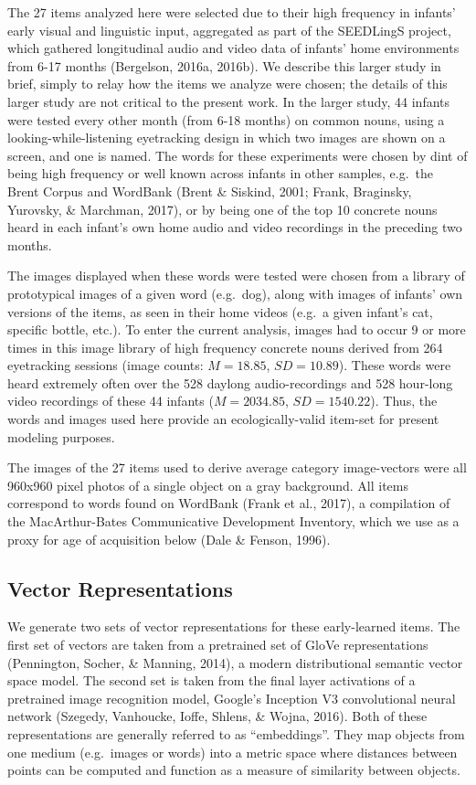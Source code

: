 \documentclass[10pt, letterpaper]{article}
\begin{document}
The 27 items analyzed here were selected due to their high frequency in
infants' early visual and linguistic input, aggregated as part of the
SEEDLingS project, which gathered longitudinal audio and video data of
infants' home environments from 6-17 months (Bergelson, 2016a, 2016b).
We describe this larger study in brief, simply to relay how the items we
analyze were chosen; the details of this larger study are not critical
to the present work. In the larger study, 44 infants were tested every
other month (from 6-18 months) on common nouns, using a
looking-while-listening eyetracking design in which two images are shown
on a screen, and one is named. The words for these experiments were
chosen by dint of being high frequency or well known across infants in
other samples, e.g.~the Brent Corpus and WordBank (Brent \& Siskind,
2001; Frank, Braginsky, Yurovsky, \& Marchman, 2017), or by being one of
the top 10 concrete nouns heard in each infant's own home audio and
video recordings in the preceding two months.

The images displayed when these words were tested were chosen from a
library of prototypical images of a given word (e.g.~dog), along with
images of infants' own versions of the items, as seen in their home
videos (e.g.~a given infant's cat, specific bottle, etc.). To enter the
current analysis, images had to occur 9 or more times in this image
library of high frequency concrete nouns derived from 264 eyetracking
sessions (image counts: \(M=18.85\), \(SD=10.89\)). These words were
heard extremely often over the 528 daylong audio-recordings and 528
hour-long video recordings of these 44 infants (\(M=2034.85\),
\(SD=1540.22\)). Thus, the words and images used here provide an
ecologically-valid item-set for present modeling purposes.

The images of the 27 items used to derive average category image-vectors
were all 960x960 pixel photos of a single object on a gray background.
All items correspond to words found on WordBank (Frank et al., 2017), a
compilation of the MacArthur-Bates Communicative Development Inventory,
which we use as a proxy for age of acquisition below (Dale \& Fenson,
1996).

\subsection{Vector Representations}\label{vector-representations}

We generate two sets of vector representations for these early-learned
items. The first set of vectors are taken from a pretrained set of GloVe
representations (Pennington, Socher, \& Manning, 2014), a modern
distributional semantic vector space model. The second set is taken from
the final layer activations of a pretrained image recognition model,
Google's Inception V3 convolutional neural network (Szegedy, Vanhoucke,
Ioffe, Shlens, \& Wojna, 2016). Both of these representations are
generally referred to as ``embeddings''. They map objects from one
medium (e.g.~images or words) into a metric space where distances
between points can be computed and function as a measure of similarity
between objects.
\end{document}
